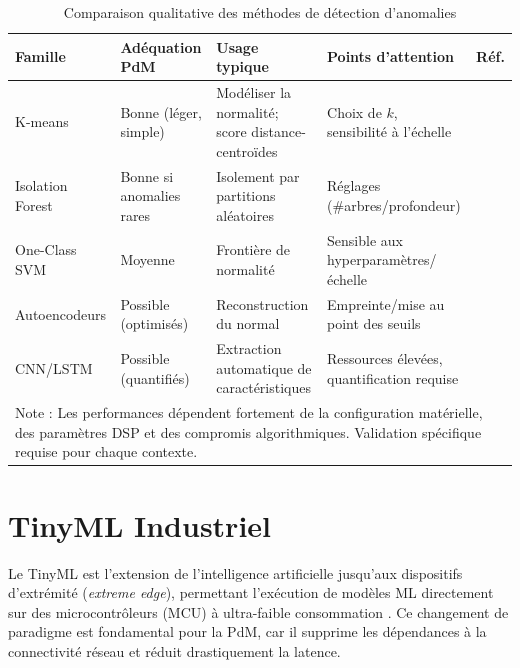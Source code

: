 \begin{table}[ht]
\centering
\caption{Comparaison qualitative des méthodes de détection d'anomalies}
\label{tab:ml_comparison}
\begin{tabular}{p{2.8cm}p{2.5cm}p{4.2cm}p{3.2cm}p{2cm}}
\toprule
\textbf{Famille} &
\textbf{Adéquation PdM} &
\textbf{Usage typique} &
\textbf{Points d'attention} &
\textbf{Réf.} \\
\midrule

K-means &
Bonne (léger, simple) &
Modéliser la normalité; score distance-centroïdes &
Choix de $k$, sensibilité à l'échelle &
\cite{macqueen1967,chandola2009} \\
\midrule

Isolation Forest &
Bonne si anomalies rares &
Isolement par partitions aléatoires &
Réglages (\#arbres/profondeur) &
\cite{chandola2009,antonini2023} \\
\midrule

One-Class SVM &
Moyenne &
Frontière de normalité &
Sensible aux hyperparamètres/échelle &
\cite{chandola2009} \\
\midrule

Autoencodeurs &
Possible (optimisés) &
Reconstruction du normal &
Empreinte/mise au point des seuils &
\cite{chandola2009,ran2019} \\
\midrule

CNN/LSTM &
Possible (quantifiés) &
Extraction automatique de caractéristiques &
Ressources élevées, quantification requise &
\cite{langer2025,arciniegas2025} \\

\bottomrule
\multicolumn{5}{p{15cm}}{\small Note : Les performances dépendent fortement de la configuration matérielle, des paramètres DSP et des compromis algorithmiques. Validation spécifique requise pour chaque contexte.} \\
\end{tabular}
\end{table}


\section{TinyML Industriel}
\label{sec:tinyml_industriel}

Le TinyML est l'extension de l'intelligence artificielle jusqu'aux dispositifs d'extrémité (\textit{extreme edge}), permettant l'exécution de modèles ML directement sur des microcontrôleurs (MCU) à ultra-faible consommation \cite{tsoukas2024,njor2024}. Ce changement de paradigme est fondamental pour la PdM, car il supprime les dépendances à la connectivité réseau et réduit drastiquement la latence.

